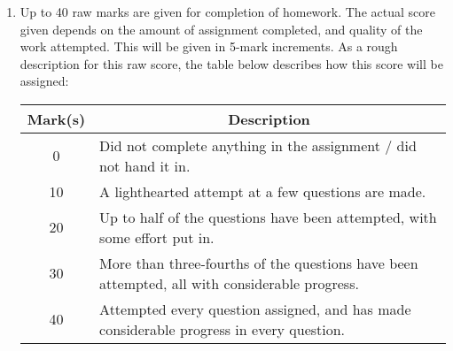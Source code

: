 \documentclass{amsart}
\theoremstyle{definition}
\theoremstyle{definition}
\DeclareMathOperator{\1}{\mathbbm{1}}
\begin{document}
\begin{enumerate}[itemsep=.75em]
	
	
	\item Up to 40 raw marks are given for completion of homework. The actual score given depends on the amount of assignment completed, and quality of the work attempted. This will be given in 5-mark increments. As a rough description for this raw score, the table below describes how this score will be assigned:
	
	\begin{center}
		\begin{tabular}{c | p{9cm}}
			\textbf{Mark(s)} & \multicolumn{1}{c}{\textbf{Description}} \\
			\hline
			0 & Did not complete anything in the assignment / did not hand it in. \\
			\hline
			10 & A lighthearted attempt at a few questions are made. \\
			\hline
			20 & Up to half of the questions have been attempted, with some effort put in. \\
			\hline
			30 & More than three-fourths of the questions have been attempted, all with considerable progress. \\
			\hline
			40 & Attempted every question assigned, and has made considerable progress in every question.
		\end{tabular}
	\end{center}
	
%	
%	
%	
	

\end{enumerate}
\end{document}
